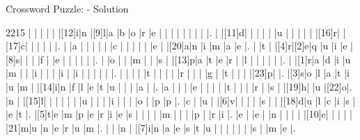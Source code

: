 \documentclass[12pt]{article}
\begin{document}
\newpage
\begin{center}
  \huge{Crossword Puzzle: - Solution}
\end{center}
\vspace{1.5cm}
\PuzzleSolution
\begin{Puzzle}{22}{15}
  |{}  |{}  |{}  |{}  |{}  |[12]i|n   |[9]l|a   |b   |o   |r   |e   |{}  |{}  |{}  |{}  |{}  |{}  |{}  |{}  |.
  |{}  |[11]d|{}  |{}  |{}  |{}  |{}  |u   |{}  |{}  |{}  |{}  |{}  |[16]r|{}  |[17]c|{}  |{}  |{}  |{}  |{}  |.
  |{}  |a   |{}  |{}  |{}  |{}  |{}  |c   |{}  |{}  |{}  |{}  |{}  |e   |{}  |[20]a|n   |i   |m   |a   |e   |.
  |{}  |t   |{}  |[4]r|[2]e|q   |u   |i   |e   |[8]s|{}  |{}  |{}  |f   |{}  |e   |{}  |{}  |{}  |{}  |{}  |.
  |{}  |o   |{}  |{}  |m   |{}  |{}  |s   |{}  |[13]p|a   |t   |e   |r   |{}  |l   |{}  |{}  |{}  |{}  |{}  |.
  |{}  |[1]r|a   |d   |i   |u   |m   |{}  |{}  |i   |{}  |{}  |{}  |i   |{}  |i   |{}  |{}  |{}  |{}  |{}  |.
  |{}  |{}  |{}  |{}  |t   |{}  |{}  |{}  |{}  |r   |{}  |{}  |{}  |g   |{}  |t   |{}  |{}  |{}  |[23]p|{}  |.
  |[3]s|o   |l   |a   |t   |i   |u   |m   |{}  |[14]i|n   |f   |l   |e   |t   |u   |{}  |{}  |{}  |a   |{}  |.
  |a   |{}  |{}  |{}  |e   |{}  |{}  |{}  |{}  |t   |{}  |{}  |{}  |r   |{}  |s   |{}  |[19]h|{}  |u   |[22]o|.
  |n   |{}  |[15]l|{}  |{}  |{}  |{}  |{}  |{}  |u   |{}  |{}  |{}  |i   |{}  |{}  |{}  |o   |{}  |p   |p   |.
  |c   |{}  |u   |{}  |[6]v|{}  |{}  |{}  |{}  |s   |{}  |{}  |[18]d|u   |l   |c   |i   |s   |{}  |e   |t   |.
  |[5]t|e   |m   |p   |e   |r   |i   |e   |s   |{}  |{}  |{}  |{}  |m   |{}  |{}  |{}  |p   |{}  |r   |i   |.
  |e   |{}  |e   |{}  |n   |{}  |{}  |{}  |{}  |[10]e|{}  |{}  |{}  |{}  |[21]m|u   |n   |e   |r   |u   |m   |.
  |{}  |{}  |n   |{}  |[7]i|n   |a   |e   |s   |t   |u   |{}  |{}  |{}  |{}  |{}  |{}  |s   |{}  |m   |e   |.
\end{Puzzle}
\end{document}
